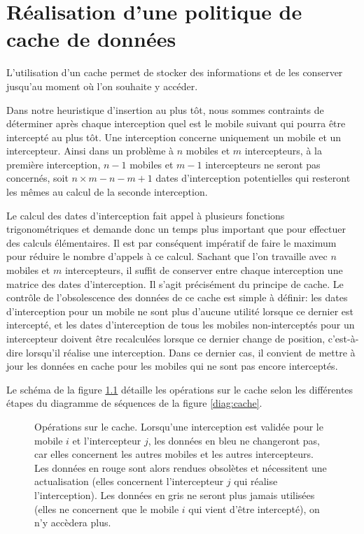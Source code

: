 \chapter{Réalisation d'une politique de cache de données}
\label{app:cache}
	L'utilisation d'un \gls{cache} permet de stocker des informations et de les conserver jusqu'au moment où l'on souhaite y accéder.

	Dans notre heuristique d'insertion au plus tôt, nous sommes contraints de déterminer après chaque interception quel est le mobile suivant qui pourra être intercepté au plus tôt. Une interception concerne uniquement un mobile et un intercepteur. Ainsi dans un problème à $n$ mobiles et $m$ intercepteurs, à la première interception, $n-1$ mobiles et $m-1$ intercepteurs ne seront pas concernés, soit $n \times m -n -m +1$ dates d'interception potentielles qui resteront les mêmes au calcul de la seconde interception.

	Le calcul des dates d'interception fait appel à plusieurs fonctions trigonométriques et demande donc un temps plus important que pour effectuer des calculs élémentaires. Il est par conséquent impératif de faire le maximum pour réduire le nombre d'appels à ce calcul. Sachant que l'on travaille avec $n$ mobiles et $m$ intercepteurs, il suffit de conserver entre chaque interception une matrice des dates d'interception. Il s'agit précisément du principe de cache. Le contrôle de l'obsolescence des données de ce cache est simple à définir: les dates d'interception pour un mobile ne sont plus d'aucune utilité lorsque ce dernier est intercepté, et les dates d'interception de tous les mobiles non-interceptés pour un intercepteur doivent être recalculées lorsque ce dernier change de position, c'est-à-dire lorsqu'il réalise une interception. Dans ce dernier cas, il convient de mettre à jour les données en cache pour les mobiles qui ne sont pas encore interceptés.

	Le schéma de la figure \ref{fig:cache} détaille les opérations sur le cache selon les différentes étapes du diagramme de séquences de la figure \ref{diag:cache}.
	\begin{figure}[h]
		\centering
		\begin{tikzpicture}
			
		\end{tikzpicture}
		\caption[Opérations sur le cache]{Opérations sur le cache. {\scriptsize Lorsqu'une interception est validée pour le mobile $i$ et l'intercepteur $j$, les données en bleu ne changeront pas, car elles concernent les autres mobiles et les autres intercepteurs. Les données en rouge sont alors rendues obsolètes et nécessitent une actualisation (elles concernent l'intercepteur $j$ qui réalise l'interception). Les données en gris ne seront plus jamais utilisées (elles ne concernent que le mobile $i$ qui vient d'être intercepté), on n'y accèdera plus.}}
		\label{fig:cache}
	\end{figure}

